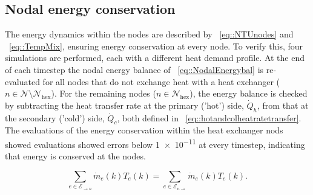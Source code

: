 \subsection{Nodal energy conservation}
The energy dynamics within the nodes are described by ~\eqref{eq::NTUnodes} and ~\eqref{eq::TempMix}, ensuring energy conservation at every node. To verify this, four simulations are performed, each with a different heat demand profile. At the end of each timestep the nodal energy balance of ~\eqref{eq::NodalEnergybal} is re-evaluated for all nodes that do not exchange heat with a heat exchanger ($n \in \mathcal{N} \setminus \mathcal{N}_{\text{hex}}$). For the remaining nodes ($n \in \mathcal{N}_{\text{hex}}$), the energy balance is checked by subtracting the heat transfer rate at the primary ('hot') side, 
$\dot{Q}_h$, from that at the secondary ('cold') side, $\dot{Q}_c$, both defined in ~\eqref{eq::hotandcolheatratetransfer}. 
The evaluations of the energy conservation within the heat exchanger nods showed evaluations showed errors below \num{1e-11} at every timestep, indicating that energy is conserved at the nodes.

\begin{equation}\label{eq::NodalEnergybal}
        \sum_{e  \in \mathcal{E}_{\rightarrow n}} \dot{m}_e(k)T_e(k) = \sum_{e  \in \mathcal{E}_{n \rightarrow}} \dot{m}_e(k)T_e(k).
\end{equation}


